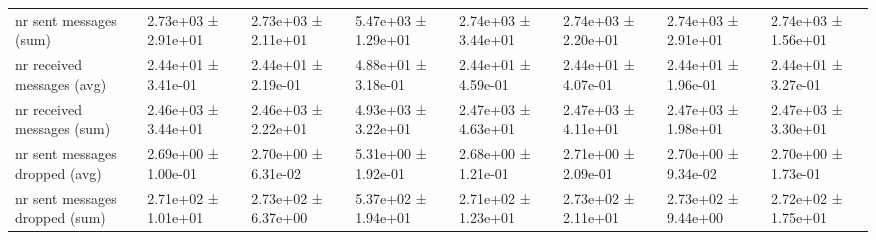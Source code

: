 \begin{tabular}{llllllll}
 nr sent messages (sum)             & 2.73e+03 ± 2.91e+01 & 2.73e+03 ± 2.11e+01 & 5.47e+03 ± 1.29e+01 & 2.74e+03 ± 3.44e+01 & 2.74e+03 ± 2.20e+01 & 2.74e+03 ± 2.91e+01 & 2.74e+03 ± 1.56e+01   \\
 nr received messages (avg)         & 2.44e+01 ± 3.41e-01 & 2.44e+01 ± 2.19e-01 & 4.88e+01 ± 3.18e-01 & 2.44e+01 ± 4.59e-01 & 2.44e+01 ± 4.07e-01 & 2.44e+01 ± 1.96e-01 & 2.44e+01 ± 3.27e-01   \\
 nr received messages (sum)         & 2.46e+03 ± 3.44e+01 & 2.46e+03 ± 2.22e+01 & 4.93e+03 ± 3.22e+01 & 2.47e+03 ± 4.63e+01 & 2.47e+03 ± 4.11e+01 & 2.47e+03 ± 1.98e+01 & 2.47e+03 ± 3.30e+01   \\
 nr sent messages dropped (avg)     & 2.69e+00 ± 1.00e-01 & 2.70e+00 ± 6.31e-02 & 5.31e+00 ± 1.92e-01 & 2.68e+00 ± 1.21e-01 & 2.71e+00 ± 2.09e-01 & 2.70e+00 ± 9.34e-02 & 2.70e+00 ± 1.73e-01   \\
 nr sent messages dropped (sum)     & 2.71e+02 ± 1.01e+01 & 2.73e+02 ± 6.37e+00 & 5.37e+02 ± 1.94e+01 & 2.71e+02 ± 1.23e+01 & 2.73e+02 ± 2.11e+01 & 2.73e+02 ± 9.44e+00 & 2.72e+02 ± 1.75e+01   \\
\hline
\end{tabular}